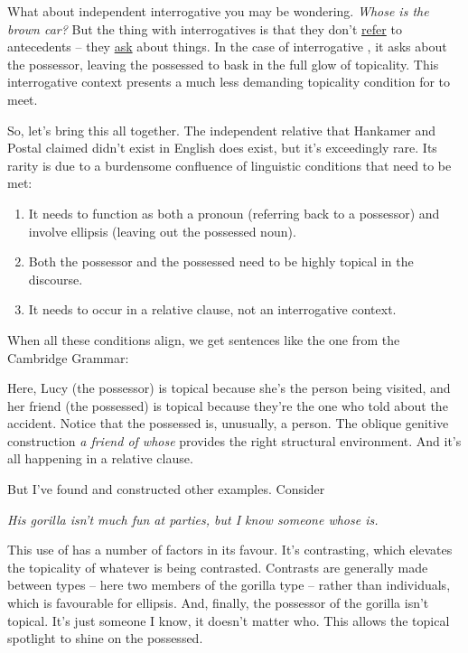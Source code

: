 What about independent interrogative  you may be wondering. \textit{Whose is the brown car?} But the thing with interrogatives is that they don't \uline{refer} to antecedents -- they \uline{ask} about things. In the case of interrogative , it asks about the possessor, leaving the possessed to bask in the full glow of topicality. This interrogative context presents a much less demanding topicality condition for  to meet.

So, let's bring this all together. The independent relative  that Hankamer and Postal claimed didn't exist in English does exist, but it's exceedingly rare. Its rarity is due to a burdensome confluence of linguistic conditions that need to be met:

\begin{enumerate}
    \item It needs to function as both a pronoun (referring back to a possessor) and involve ellipsis (leaving out the possessed noun).
    \item Both the possessor and the possessed need to be highly topical in the discourse.
    \item It needs to occur in a relative clause, not an interrogative context.
\end{enumerate}


When all these conditions align, we get sentences like the one from the Cambridge Grammar:

\z

Here, Lucy (the possessor) is topical because she's the person being visited, and her friend (the possessed) is topical because they're the one who told about the accident. Notice that the possessed is, unusually, a person. The oblique genitive construction \textit{a friend of whose} provides the right structural environment. And it's all happening in a relative clause.

But I've found and constructed other examples. Consider

\ea \textit{His gorilla isn't much fun at parties, but I know someone whose is.}
\z

This use of  has a number of factors in its favour. It's contrasting, which elevates the topicality of whatever is being contrasted. Contrasts are generally made between types -- here two members of the gorilla type -- rather than individuals, which is favourable for ellipsis. And, finally, the possessor of the gorilla isn't topical. It's just someone I know, it doesn't matter who. This allows the topical spotlight to shine on the possessed.

